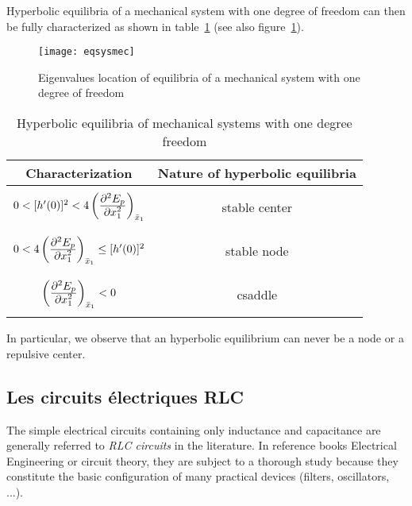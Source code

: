 Hyperbolic equilibria of a mechanical system with one degree of freedom can then be fully characterized as shown in table~\ref{tab:tabsysmec} (see also figure~\ref{fig:eqsysmec}).
\begin{figure}[t] 
   \centering
   \texttt{[image: eqsysmec]} 
   \caption{Eigenvalues location of equilibria of a mechanical system with one degree of freedom}
   \label{fig:eqsysmec}
\end{figure}
\begin{table}
\hspace*{5mm}
\begin{tabular}{|c|c|}
\hline
Characterization&Nature of hyperbolic equilibria\\ \hline
{}&{}\\
$0< [h'(0)]^2 <4 \left (\frac{{\textstyle \partial^2E_p}}{{\textstyle \partial x_1^2}}\right
)_{\bar x_1}$&stable center \\
{}&{}\\ \hline
{}&{}\\
$0<4 \left (\frac{{\textstyle \partial^2E_p}}{{\textstyle \partial x_1^2}}\right
)_{\bar x_1}\leq [h'(0)]^2$&stable node \\
{}&{}\\
 \hline
 {}&{}\\
$\left (\frac{{\textstyle \partial^2E_p}}{{\textstyle \partial x_1^2}}\right
)_{\bar x_1} <0$&csaddle \\ 
{}&{}\\
\hline
\end{tabular}
\caption{
Hyperbolic equilibria of mechanical systems with one degree
freedom}
\label{tab:tabsysmec}
\end{table}
In particular, we observe that an hyperbolic equilibrium can never be a node or a repulsive center.

\subsection{Les circuits électriques RLC}

The simple electrical circuits containing only inductance and capacitance are generally referred to {\em RLC circuits} in the literature. In reference books
Electrical Engineering or circuit theory, they are subject
to a thorough study because they constitute the basic configuration of many practical devices (filters, oscillators, ...).

